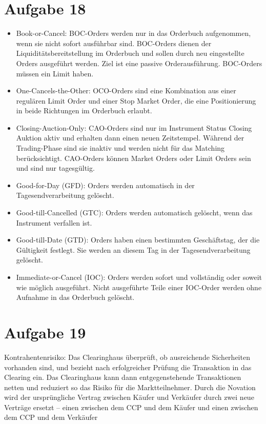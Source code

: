 \documentclass{article}
\begin{document}
	\section*{Aufgabe 18}
	\begin{itemize}
		\item Book-or-Cancel: BOC-Orders werden nur in das Orderbuch aufgenommen, wenn sie nicht sofort ausführbar sind. BOC-Orders dienen der Liquiditätsbereitstellung im Orderbuch und sollen durch neu eingestellte Orders ausgeführt werden. Ziel ist eine passive Orderausführung. BOC-Orders müssen ein Limit haben.
		\item One-Cancels-the-Other: OCO-Orders sind eine Kombination aus einer regulären Limit Order und einer Stop Market Order, die eine Positionierung in beide Richtungen im Orderbuch erlaubt.
		\item Closing-Auction-Only: CAO-Orders sind nur im Instrument Status Closing Auktion aktiv und erhalten dann einen neuen Zeitstempel. Während der Trading-Phase sind sie inaktiv und werden nicht für das Matching berücksichtigt. CAO-Orders können Market Orders oder Limit Orders sein und sind nur tagesgültig.
		\item Good-for-Day (GFD): Orders werden automatisch in der Tagesendverarbeitung gelöscht.
		\item Good-till-Cancelled (GTC): Orders werden automatisch gelöscht, wenn das Instrument verfallen ist.
		\item Good-till-Date (GTD): Orders haben einen bestimmten Geschäftstag, der die Gültigkeit festlegt. Sie werden an diesem Tag in der Tagesendverarbeitung gelöscht.
		\item Immediate-or-Cancel (IOC): Orders werden sofort und vollständig oder soweit wie möglich ausgeführt. Nicht ausgeführte Teile einer IOC-Order werden ohne Aufnahme in das Orderbuch gelöscht.
	\end{itemize}
	
	\section*{Aufgabe 19}
	Kontrahentenrisiko: Das Clearinghaus überprüft, ob ausreichende Sicherheiten vorhanden sind, und bezieht nach erfolgreicher Prüfung die Transaktion in das Clearing ein. Das Clearinghaus kann dann entgegenstehende Transaktionen netten und reduziert so das Risiko für die Marktteilnehmer. Durch die Novation wird der ursprüngliche Vertrag zwischen Käufer und Verkäufer durch zwei neue Verträge ersetzt – einen zwischen dem CCP und dem Käufer und einen zwischen dem CCP und dem Verkäufer
	
\end{document}
